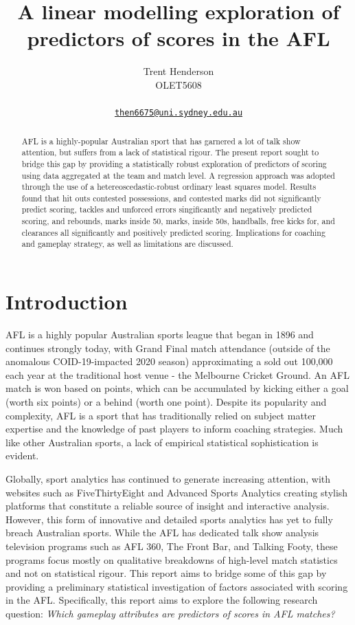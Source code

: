 \documentclass{article}
\title{A linear modelling exploration of predictors of scores in the AFL}
\author{
    Trent Henderson
   \\
    OLET5608 \\
   \\
  \texttt{\href{mailto:then6675@uni.sydney.edu.au}{\nolinkurl{then6675@uni.sydney.edu.au}}} \\
  }
\begin{document}
\maketitle

\def\tightlist{}


\begin{abstract}
AFL is a highly-popular Australian sport that has garnered a lot of talk
show attention, but suffers from a lack of statistical rigour. The
present report sought to bridge this gap by providing a statistically
robust exploration of predictors of scoring using data aggregated at the
team and match level. A regression approach was adopted through the use
of a hetereoscedastic-robust ordinary least squares model. Results found
that hit outs contested possessions, and contested marks did not
significantly predict scoring, tackles and unforced errors singificantly
and negatively predicted scoring, and rebounds, marks inside 50, marks,
inside 50s, handballs, free kicks for, and clearances all significantly
and positively predicted scoring. Implications for coaching and gameplay
strategy, as well as limitations are discussed.
\end{abstract}


\hypertarget{introduction}{%
\section{Introduction}\label{introduction}}

AFL is a highly popular Australian sports league that began in 1896 and
continues strongly today, with Grand Final match attendance (outside of
the anomalous COID-19-impacted 2020 season) approximating a sold out
100,000 each year at the traditional host venue - the Melbourne Cricket
Ground. An AFL match is won based on points, which can be accumulated by
kicking either a goal (worth six points) or a behind (worth one point).
Despite its popularity and complexity, AFL is a sport that has
traditionally relied on subject matter expertise and the knowledge of
past players to inform coaching strategies. Much like other Australian
sports, a lack of empirical statistical sophistication is evident.

Globally, sport analytics has continued to generate increasing
attention, with websites such as FiveThirtyEight and Advanced Sports
Analytics creating stylish platforms that constitute a reliable source
of insight and interactive analysis. However, this form of innovative
and detailed sports analytics has yet to fully breach Australian sports.
While the AFL has dedicated talk show analysis television programs such
as AFL 360, The Front Bar, and Talking Footy, these programs focus
mostly on qualitative breakdowns of high-level match statistics and not
on statistical rigour. This report aims to bridge some of this gap by
providing a preliminary statistical investigation of factors associated
with scoring in the AFL. Specifically, this report aims to explore the
following research question: \emph{Which gameplay attributes are
predictors of scores in AFL matches?}
\end{document}
